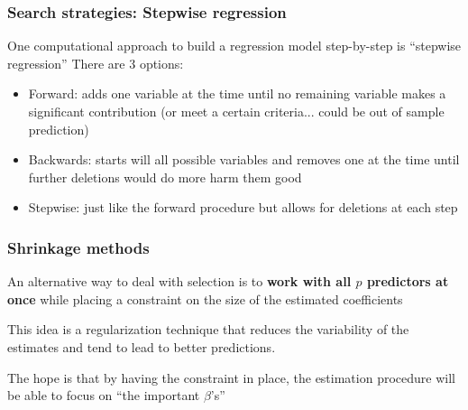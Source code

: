 \documentclass{beamer}
\newcommand{\bo}[1]{\textcolor{burntorange}{#1}}
\newcommand{\bl}{\color{lightblue}}
\newcommand{\bk}{\color{black}}
\newcommand{\bi}{\begin{itemize}}
\newcommand{\ib}{\end{itemize}}
\newcommand{\sk}{\vspace{.5cm}}
\newcommand{\sko}{\vspace{.1in}}
\newcommand{\skoo}{\vspace{.2in}}
\begin{document}



\begin{frame}
\frametitle{Search strategies: Stepwise regression}
One computational approach to build a regression model step-by-step is ``stepwise regression''  There are 3 options:
\bi \sk
\item {\color{red} Forward:} adds one variable at the time until no remaining variable makes a significant contribution (or meet a certain criteria... could be out of sample prediction)
\item {\color{red} Backwards:} starts will all possible variables and removes one at the time until further deletions would do more harm them good
\item {\color{red} Stepwise:} just like the forward procedure but allows for deletions at each step
\ib 

\end{frame}


\begin{frame}
\frametitle{Shrinkage methods}

An alternative way to deal with selection is to \bo{\bf work with all $p$ predictors at once} while placing a constraint on the size of the estimated coefficients

\skoo

This idea is a regularization technique that reduces the variability of the estimates and tend to lead to better predictions. 

\skoo

The hope is that by having the constraint in place, the estimation procedure will be able to focus on ``the important $\beta$'s''

\end{frame}
\end{document}
